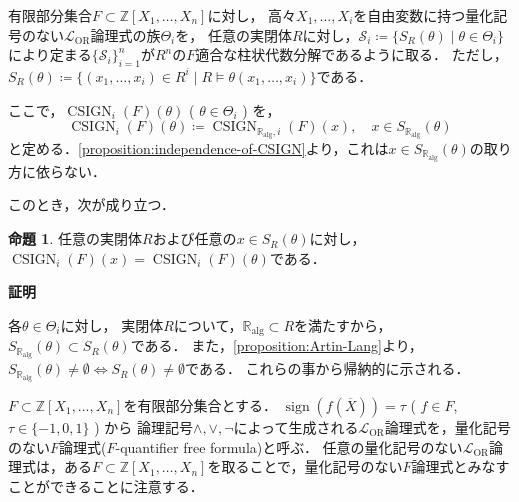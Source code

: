 \documentclass[uplatex, dvipdfmx]{jsarticle}
\makeatletter
\numberwithin{equation}{section}
\renewenvironment{proof}[1][\proofname]{\par
  \pushQED{\qed}%
  \normalfont \topsep6\p@\@plus6\p@\relax
  \trivlist
  \item\relax
  {\bfseries
  #1\@addpunct{.}}\hspace\labelsep\ignorespaces
}{
  \popQED\endtrivlist\@endpefalse
}
\newcommand{\Ralg}{\mathbb{R}_\mathrm{alg}}
\newcommand{\Z}{\mathbb{Z}}
\DeclareMathOperator{\sign}{sign}
\DeclareMathOperator{\CSIGN}{CSIGN}
\theoremstyle{definition}
\newtheorem{proposition}[definition]{命題}
\renewcommand{\proofname}{\textbf{証明}}
\makeatother
\begin{document}
有限部分集合$F \subset \Z[X_1, \dots, X_n]$に対し，
高々$X_1, \dots, X_i$を自由変数に持つ量化記号のない$\mathcal{L}_\mathrm{OR}$論理式の族$\Theta_i$を，
任意の実閉体$R$に対し，$\mathcal{S}_i \coloneqq \{S_R(\theta) \mid \theta \in \Theta_i\}$により定まる$\{\mathcal{S}_i\}_{i=1}^n$が$R^n$の$F$適合な柱状代数分解であるように取る．
ただし，$S_R(\theta) \coloneqq \{(x_1, \dots, x_i) \in R^i \mid R \models \theta(x_1, \dots, x_i)\}$である．

ここで，$\CSIGN_i(F)(\theta)$ ( $\theta \in \Theta_i$ ) を，
\begin{equation}
     \CSIGN_i(F)(\theta) \coloneqq \CSIGN_{\Ralg, i}(F)(x), \quad x \in S_{\Ralg}(\theta)
\end{equation}
と定める．\cref{proposition:independence-of-CSIGN}より，これは$x \in S_{\Ralg}(\theta)$の取り方に依らない．

このとき，次が成り立つ．

\begin{proposition}
     任意の実閉体$R$および任意の$x \in S_R(\theta)$に対し，
     $\CSIGN_i(F)(x) = \CSIGN_i(F)(\theta)$である．
\end{proposition}

\begin{proof}
     各$\theta \in \Theta_i$に対し，
     実閉体$R$について，$\Ralg \subset R$を満たすから，
     $S_{\Ralg}(\theta) \subset S_R(\theta)$である．
     また，\cref{proposition:Artin-Lang}より，
     $S_{\Ralg}(\theta) \neq \emptyset \iff S_R(\theta) \neq \emptyset$である．
     これらの事から帰納的に示される．
\end{proof}

$F \subset \Z[X_1, \dots, X_n]$を有限部分集合とする．
$\sign(f(\overline{X})) = \tau$ ( $f \in F$, $\tau \in \{-1, 0, 1\}$ ) から
論理記号$\land, \lor, \lnot$によって生成される$\mathcal{L}_\mathrm{OR}$論理式を，量化記号のない$F$論理式($F$-quantifier free formula)と呼ぶ．
任意の量化記号のない$\mathcal{L}_\mathrm{OR}$論理式は，ある$F \subset \Z[X_1, \dots, X_n]$を取ることで，量化記号のない$F$論理式とみなすことができることに注意する．
\end{document}
